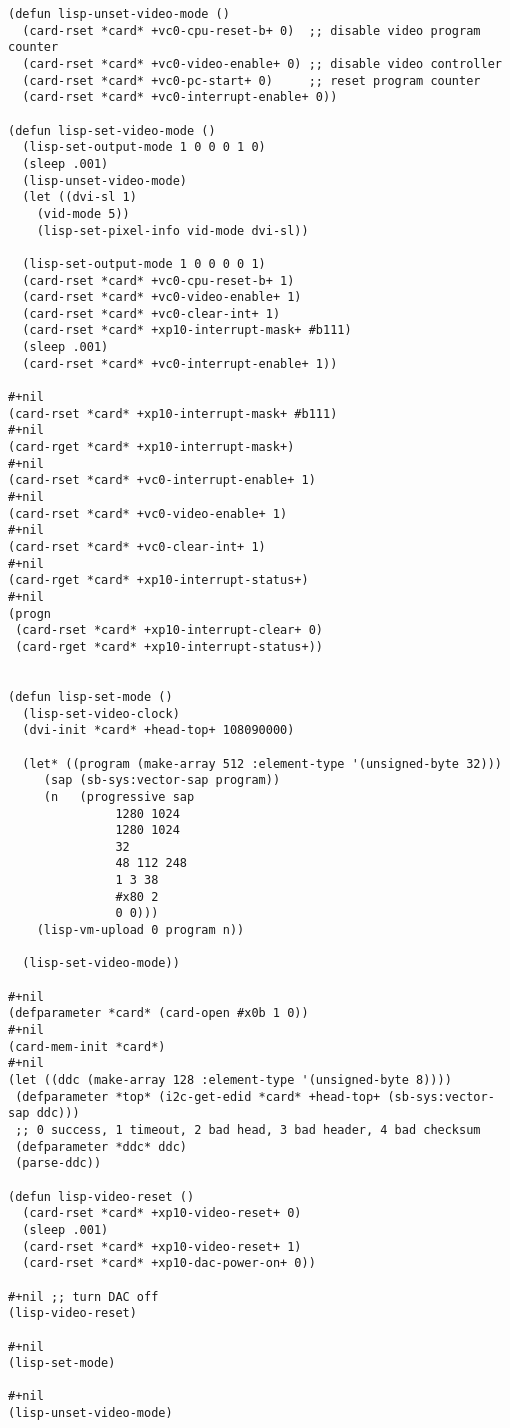 \documentclass[%
  DIV19]{scrartcl}
\begin{document}
\begin{lstlisting}[label=some-code,caption=SBCL Code to talk to graphics card]
(defun lisp-unset-video-mode ()
  (card-rset *card* +vc0-cpu-reset-b+ 0)  ;; disable video program counter
  (card-rset *card* +vc0-video-enable+ 0) ;; disable video controller
  (card-rset *card* +vc0-pc-start+ 0)     ;; reset program counter
  (card-rset *card* +vc0-interrupt-enable+ 0))

(defun lisp-set-video-mode ()
  (lisp-set-output-mode 1 0 0 0 1 0)
  (sleep .001)
  (lisp-unset-video-mode)
  (let ((dvi-sl 1)
	(vid-mode 5))
    (lisp-set-pixel-info vid-mode dvi-sl))
  
  (lisp-set-output-mode 1 0 0 0 0 1)
  (card-rset *card* +vc0-cpu-reset-b+ 1)
  (card-rset *card* +vc0-video-enable+ 1)
  (card-rset *card* +vc0-clear-int+ 1)
  (card-rset *card* +xp10-interrupt-mask+ #b111)
  (sleep .001)
  (card-rset *card* +vc0-interrupt-enable+ 1))

#+nil
(card-rset *card* +xp10-interrupt-mask+ #b111)
#+nil
(card-rget *card* +xp10-interrupt-mask+)
#+nil
(card-rset *card* +vc0-interrupt-enable+ 1)
#+nil
(card-rset *card* +vc0-video-enable+ 1)
#+nil
(card-rset *card* +vc0-clear-int+ 1)
#+nil
(card-rget *card* +xp10-interrupt-status+)
#+nil
(progn
 (card-rset *card* +xp10-interrupt-clear+ 0)
 (card-rget *card* +xp10-interrupt-status+))


(defun lisp-set-mode ()
  (lisp-set-video-clock)
  (dvi-init *card* +head-top+ 108090000)

  (let* ((program (make-array 512 :element-type '(unsigned-byte 32)))
	 (sap (sb-sys:vector-sap program))
	 (n   (progressive sap
			   1280 1024
			   1280 1024
			   32 
			   48 112 248
			   1 3 38
			   #x80 2
			   0 0)))
    (lisp-vm-upload 0 program n)) 
  
  (lisp-set-video-mode))

#+nil
(defparameter *card* (card-open #x0b 1 0))
#+nil
(card-mem-init *card*)
#+nil
(let ((ddc (make-array 128 :element-type '(unsigned-byte 8))))
 (defparameter *top* (i2c-get-edid *card* +head-top+ (sb-sys:vector-sap ddc)))
 ;; 0 success, 1 timeout, 2 bad head, 3 bad header, 4 bad checksum
 (defparameter *ddc* ddc)
 (parse-ddc))

(defun lisp-video-reset ()
  (card-rset *card* +xp10-video-reset+ 0)
  (sleep .001)
  (card-rset *card* +xp10-video-reset+ 1)
  (card-rset *card* +xp10-dac-power-on+ 0))

#+nil ;; turn DAC off
(lisp-video-reset)

#+nil
(lisp-set-mode)

#+nil
(lisp-unset-video-mode)


\end{lstlisting}
\end{document}
